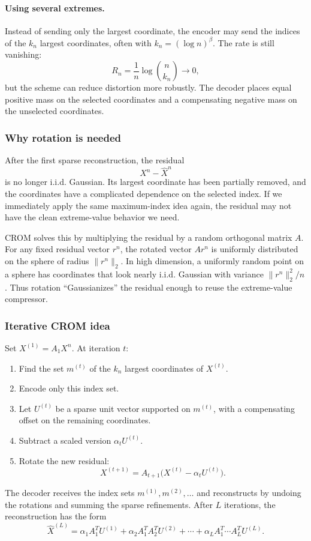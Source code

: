 \paragraph{Using several extremes.}
Instead of sending only the largest coordinate, the encoder may send the indices of the $k_n$ largest coordinates, often with $k_n=(\log n)^\beta$.
The rate is still vanishing:
\[
    R_n=\frac1n\log {n\choose k_n}\to 0,
\]
but the scheme can reduce distortion more robustly.
The decoder places equal positive mass on the selected coordinates and a compensating negative mass on the unselected coordinates.

\subsubsection*{Why rotation is needed}

After the first sparse reconstruction, the residual
\[
    X^n-\widehat X^n
\]
is no longer i.i.d. Gaussian.
Its largest coordinate has been partially removed, and the coordinates have a complicated dependence on the selected index.
If we immediately apply the same maximum-index idea again, the residual may not have the clean extreme-value behavior we need.

CROM solves this by multiplying the residual by a random orthogonal matrix $A$.
For any fixed residual vector $r^n$, the rotated vector $Ar^n$ is uniformly distributed on the sphere of radius $\|r^n\|_2$.
In high dimension, a uniformly random point on a sphere has coordinates that look nearly i.i.d. Gaussian with variance $\|r^n\|_2^2/n$.
Thus rotation ``Gaussianizes'' the residual enough to reuse the extreme-value compressor.

\subsubsection*{Iterative CROM idea}

Set $X^{(1)}=A_1X^n$.
At iteration $t$:
\begin{enumerate}[leftmargin=2em]
    \item Find the set $m^{(t)}$ of the $k_n$ largest coordinates of $X^{(t)}$.
    \item Encode only this index set.
    \item Let $U^{(t)}$ be a sparse unit vector supported on $m^{(t)}$, with a compensating offset on the remaining coordinates.
    \item Subtract a scaled version $\alpha_t U^{(t)}$.
    \item Rotate the new residual:
    \[
        X^{(t+1)}=A_{t+1}\bigl(X^{(t)}-\alpha_tU^{(t)}\bigr).
    \]
\end{enumerate}
The decoder receives the index sets $m^{(1)},m^{(2)},\ldots$ and reconstructs by undoing the rotations and summing the sparse refinements.
After $L$ iterations, the reconstruction has the form
\begin{equation}
    \widehat X^{(L)}
    =\alpha_1A_1^TU^{(1)}+
    \alpha_2A_1^TA_2^TU^{(2)}+
    \cdots+
    \alpha_LA_1^T\cdots A_L^TU^{(L)}.
\end{equation}

